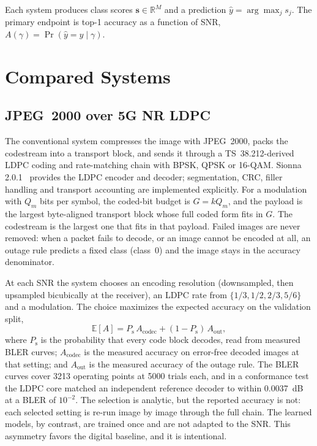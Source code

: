\documentclass[conference]{IEEEtran}
\begin{document}
Each system produces class scores $\mathbf{s}\in\mathbb{R}^{M}$ and a prediction $\hat y=\arg\max_j s_j$. The primary endpoint is top-1 accuracy as a function of SNR, $A(\gamma)=\Pr(\hat y=y\mid\gamma)$.

\section{Compared Systems}
\subsection{JPEG~2000 over 5G NR LDPC}
The conventional system compresses the image with JPEG~2000, packs the codestream into a transport block, and sends it through a TS~38.212-derived LDPC coding and rate-matching chain with BPSK, QPSK or 16-QAM. Sionna 2.0.1~\cite{sionna} provides the LDPC encoder and decoder; segmentation, CRC, filler handling and transport accounting are implemented explicitly. For a modulation with $Q_m$ bits per symbol, the coded-bit budget is $G=kQ_m$, and the payload is the largest byte-aligned transport block whose full coded form fits in $G$. The codestream is the largest one that fits in that payload. Failed images are never removed: when a packet fails to decode, or an image cannot be encoded at all, an outage rule predicts a fixed class (class~0) and the image stays in the accuracy denominator.

At each SNR the system chooses an encoding resolution (downsampled, then upsampled bicubically at the receiver), an LDPC rate from $\{1/3,1/2,2/3,5/6\}$ and a modulation. The choice maximizes the expected accuracy on the validation split,
\begin{equation}
 \mathbb{E}[A]=P_{\mathrm{s}}\,A_{\mathrm{codec}}+(1-P_{\mathrm{s}})\,A_{\mathrm{out}},
\end{equation}
where $P_{\mathrm{s}}$ is the probability that every code block decodes, read from measured BLER curves; $A_{\mathrm{codec}}$ is the measured accuracy on error-free decoded images at that setting; and $A_{\mathrm{out}}$ is the measured accuracy of the outage rule. The BLER curves cover 3213 operating points at 5000 trials each, and in a conformance test the LDPC core matched an independent reference decoder to within 0.0037~dB at a BLER of $10^{-2}$. The selection is analytic, but the reported accuracy is not: each selected setting is re-run image by image through the full chain. The learned models, by contrast, are trained once and are not adapted to the SNR. This asymmetry favors the digital baseline, and it is intentional.
\end{document}
